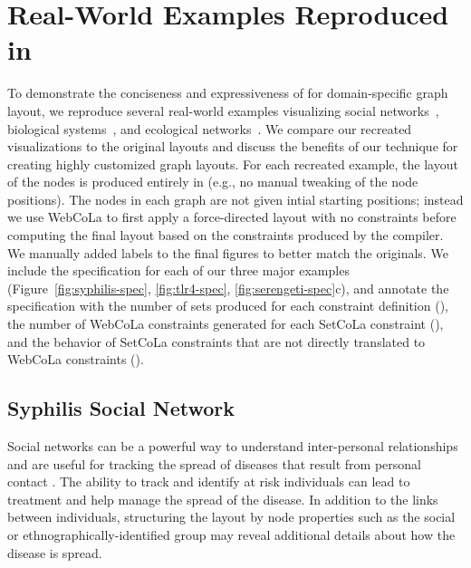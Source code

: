 \section{Real-World Examples Reproduced in \projectname}

To demonstrate the conciseness and expressiveness of \projectname for domain-specific
graph layout, we reproduce several real-world examples visualizing social 
networks~\cite{rothenberg1998using}, biological systems~\cite{barsky2008cerebral}, 
and ecological networks~\cite{kruger2017,baskerville2011spatial}. 
We compare our recreated visualizations to the original layouts and 
discuss the benefits of our technique for creating highly customized graph layouts.
For each recreated example, the layout of the nodes is produced
entirely in \projectname (e.g., no manual tweaking of the node positions).
The nodes in each graph are not given intial starting positions; instead we 
use WebCoLa to first apply a force-directed layout with no constraints 
before computing the final layout based on the constraints produced by the \projectname compiler.
We manually added labels to the final figures to better match the originals.
We include the specification for each of our three major examples 
(Figure~\ref{fig:syphilis-spec}, \ref{fig:tlr4-spec}, \ref{fig:serengeti-spec}c),
and annotate the specification with the number of sets produced for each 
constraint definition (), the number of WebCoLa constraints generated
for each SetCoLa constraint (), and the behavior of SetCoLa constraints
that are not directly translated to WebCoLa constraints ().

\vspace{-10px}
\subsection{Syphilis Social Network}
\label{sec:syphilis-example}
Social networks can be a powerful way to understand inter-personal
relationships and are useful for tracking the spread of diseases that
result from personal contact \cite{rothenberg1998using,fitzpatrick2001preventable,mcelroy2003network,fu2011hiv}.
The ability to track and identify at risk individuals can
lead to treatment and help manage the spread of the disease. In
addition to the links between individuals, structuring the layout by node
properties such as the social or ethnographically-identified group may reveal 
additional details about how the disease is spread.


